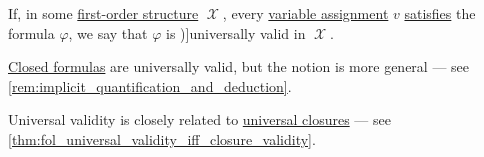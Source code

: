\begin{definition}\label{def:fol_universal_validity}
  If, in some \hyperref[def:fol_structure]{first-order structure} \( \mscrX \), every \hyperref[def:fol_variable_assignment]{variable assignment} \( v \) \hyperref[def:fol_semantics/satisfaction]{satisfies} the formula \( \varphi \), we say that \( \varphi \) is \term[ru=общезначимая (формула) (\cite[def. 2.4.1]{Герасимов2014Вычислимость})]{universally valid} in \( \mscrX \).
\end{definition}
\begin{comments}
  \item \hyperref[def:fol_closed_formula]{Closed formulas} are universally valid, but the notion is more general --- see \cref{rem:implicit_quantification_and_deduction}.

  \item Universal validity is closely related to \hyperref[def:fol_quantifier_closure]{universal closures} --- see \cref{thm:fol_universal_validity_iff_closure_validity}.
\end{comments}

